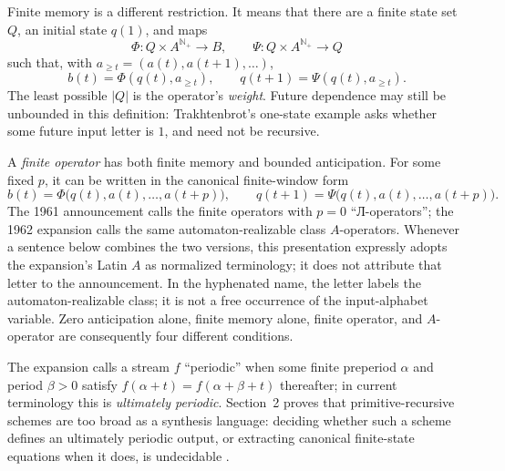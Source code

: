 Finite memory is a different restriction.  It means that there are a finite
state set \(Q\), an initial state \(q(1)\), and maps
\[
 \Phi:Q\times A^{\mathbb N_{+}}\to B,
 \qquad
 \Psi:Q\times A^{\mathbb N_{+}}\to Q
\]
such that, with \(a_{\geq t}=(a(t),a(t+1),\ldots)\),
\[
  b(t)=\Phi(q(t),a_{\geq t}),
  \qquad
  q(t+1)=\Psi(q(t),a_{\geq t}).
\]
The least possible \(\lvert Q\rvert\) is the operator's \emph{weight}.  Future
dependence may still be unbounded in this definition: Trakhtenbrot's
one-state example asks whether some future input letter is \(1\), and need not
be recursive.

A \emph{finite operator} has both finite memory and bounded anticipation.  For
some fixed \(p\), it can be written in the canonical finite-window form
\[
  b(t)=\Phi\bigl(q(t),a(t),\ldots,a(t+p)\bigr),
  \qquad
  q(t+1)=\Psi\bigl(q(t),a(t),\ldots,a(t+p)\bigr).
\]
The 1961 announcement calls the finite operators with \(p=0\)
\enquote{Л-operators}; the 1962 expansion calls the same automaton-realizable
class \(A\)-operators.  Whenever a sentence below combines the two versions,
this presentation expressly adopts the expansion's Latin \(A\) as normalized
terminology; it does not attribute that letter to the announcement.
In the hyphenated name, the letter labels the automaton-realizable class; it is
not a free occurrence of the input-alphabet variable.  Zero anticipation
alone, finite memory alone, finite operator, and \(A\)-operator are consequently
four different conditions.

The expansion calls a stream \(f\) \enquote{periodic} when some finite preperiod
\(\alpha\) and period \(\beta>0\) satisfy
\(f(\alpha+t)=f(\alpha+\beta+t)\) thereafter; in current terminology this is
\emph{ultimately periodic}.  Section~2 proves that primitive-recursive schemes
are too broad as a synthesis language: deciding whether such a scheme defines
an ultimately periodic output, or extracting canonical finite-state equations
when it does, is undecidable
\cite[pp.~109--113]{Trakhtenbrot1962Expanded}.

